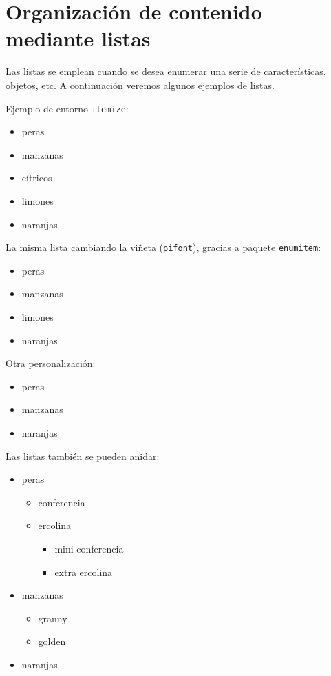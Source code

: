 \documentclass[11pt,a4paper]{article}
\begin{document}
\section{Organización de contenido mediante listas}
\label{sec:listas} %


Las listas se emplean cuando se desea enumerar una serie de características, objetos, etc. A continuación veremos algunos ejemplos de listas.

\noindent Ejemplo de entorno {\tt itemize}:

\begin{itemize}
	\item peras
	\item manzanas
    \item cítricos
        \item limones
        \item naranjas
\end{itemize}

\noindent La misma lista cambiando la viñeta (\texttt{pifont}), gracias a paquete \texttt{enumitem}:

\begin{itemize}[]
\item peras
\item[\faIcon{apple}] manzanas
\item limones
\item naranjas
\end{itemize}

\noindent Otra personalización:
\begin{itemize}[,noitemsep] %
	\item peras
	\item[\ding{55}] manzanas
	\item naranjas
\end{itemize}

\noindent Las listas también se pueden anidar:
\begin{itemize}
	\item peras
	\begin{itemize}
		\item conferencia
		\item ercolina
    	\begin{itemize}
    		\item mini conferencia
    		\item extra ercolina
    	\end{itemize}
	\end{itemize}
	\item manzanas
	\begin{itemize}
		\item granny
		\item golden 
	\end{itemize}
	\item naranjas
\end{itemize}
\end{document}
